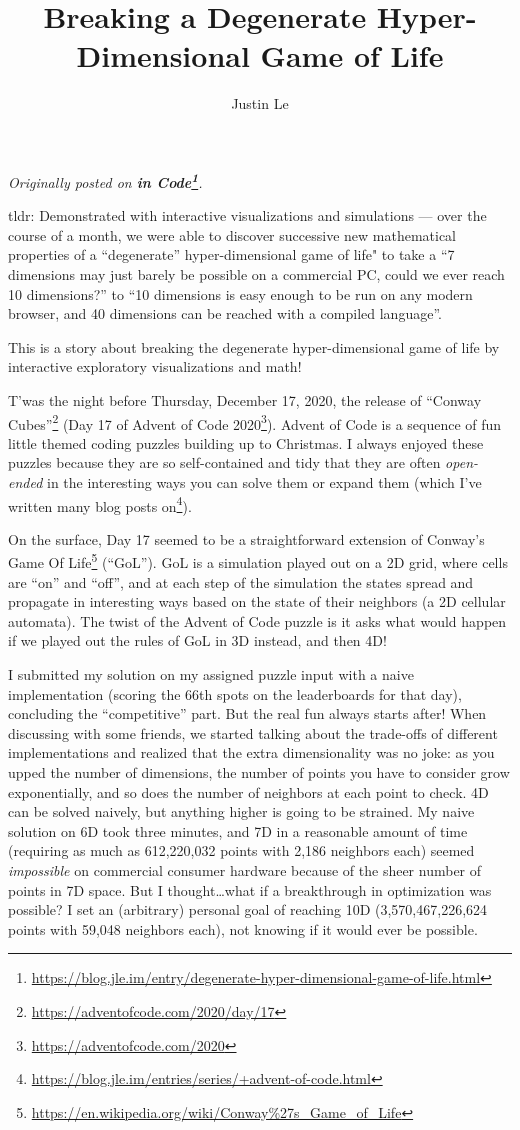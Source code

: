 \documentclass[]{article}
\title{Breaking a Degenerate Hyper-Dimensional Game of Life}
\author{Justin Le}
\renewcommand{\href}[2]{#2\footnote{\url{#1}}}
\begin{document}
\maketitle

\emph{Originally posted on
\textbf{\href{https://blog.jle.im/entry/degenerate-hyper-dimensional-game-of-life.html}{in
Code}}.}

tldr: Demonstrated with interactive visualizations and simulations --- over the
course of a month, we were able to discover successive new mathematical
properties of a ``degenerate'' hyper-dimensional game of life" to take a ``7
dimensions may just barely be possible on a commercial PC, could we ever reach
10 dimensions?'' to ``10 dimensions is easy enough to be run on any modern
browser, and 40 dimensions can be reached with a compiled language''.

This is a story about breaking the degenerate hyper-dimensional game of life by
interactive exploratory visualizations and math!

T'was the night before Thursday, December 17, 2020, the release of
\href{https://adventofcode.com/2020/day/17}{``Conway Cubes''} (Day 17 of
\href{https://adventofcode.com/2020}{Advent of Code 2020}). Advent of Code is a
sequence of fun little themed coding puzzles building up to Christmas. I always
enjoyed these puzzles because they are so self-contained and tidy that they are
often \emph{open-ended} in the interesting ways you can solve them or expand
them (which I've written
\href{https://blog.jle.im/entries/series/+advent-of-code.html}{many blog posts
on}).

On the surface, Day 17 seemed to be a straightforward extension of
\href{https://en.wikipedia.org/wiki/Conway\%27s_Game_of_Life}{Conway's Game Of
Life} (``GoL''). GoL is a simulation played out on a 2D grid, where cells are
``on'' and ``off'', and at each step of the simulation the states spread and
propagate in interesting ways based on the state of their neighbors (a 2D
cellular automata). The twist of the Advent of Code puzzle is it asks what would
happen if we played out the rules of GoL in 3D instead, and then 4D!

I submitted my solution on my assigned puzzle input with a naive implementation
(scoring the 66th spots on the leaderboards for that day), concluding the
``competitive'' part. But the real fun always starts after! When discussing with
some friends, we started talking about the trade-offs of different
implementations and realized that the extra dimensionality was no joke: as you
upped the number of dimensions, the number of points you have to consider grow
exponentially, and so does the number of neighbors at each point to check. 4D
can be solved naively, but anything higher is going to be strained. My naive
solution on 6D took three minutes, and 7D in a reasonable amount of time
(requiring as much as 612,220,032 points with 2,186 neighbors each) seemed
\emph{impossible} on commercial consumer hardware because of the sheer number of
points in 7D space. But I thought\ldots what if a breakthrough in optimization
was possible? I set an (arbitrary) personal goal of reaching 10D
(3,570,467,226,624 points with 59,048 neighbors each), not knowing if it would
ever be possible.
\end{document}

